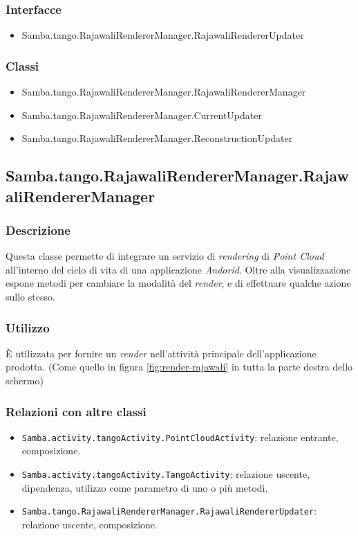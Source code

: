 \subsubsection{Interfacce}
\begin{itemize}
	\item Samba.tango.RajawaliRendererManager.RajawaliRendererUpdater
\end{itemize}
\subsubsection{Classi}
\begin{itemize}
	\item Samba.tango.RajawaliRendererManager.RajawaliRendererManager
	\item Samba.tango.RajawaliRendererManager.CurrentUpdater
	\item Samba.tango.RajawaliRendererManager.ReconstructionUpdater
\end{itemize}


\subsection{Samba.tango.RajawaliRendererManager.RajawaliRendererManager}
\subsubsection{Descrizione}
Questa classe permette di integrare un servizio di \emph{rendering} di \emph{Point Cloud} all'interno del ciclo di vita di una applicazione \emph{Andorid}. Oltre alla visualizzazione espone metodi per cambiare la modalità del \emph{render}, e di effettuare qualche azione sullo stesso.
\subsubsection{Utilizzo}
È utilizzata per fornire un \emph{render} nell'attività principale dell'applicazione prodotta. (Come quello in figura \ref{fig:render-rajawali} in tutta la parte destra dello schermo)
\subsubsection{Relazioni con altre classi}
\begin{itemize}
	\item \texttt{Samba.activity.tangoActivity.PointCloudActivity}: relazione entrante, composizione.
	\item \texttt{Samba.activity.tangoActivity.TangoActivity}: relazione uscente, dipendenza, utilizzo come parametro di uno o più metodi.
	\item \texttt{Samba.tango.RajawaliRendererManager.RajawaliRendererUpdater}: relazione uscente, composizione.
\end{itemize}

